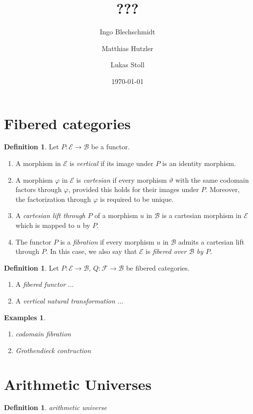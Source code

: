 \documentclass[a4paper]{amsart}
\author{Ingo Blechschmidt}
\author{Matthias Hutzler}
\author{Lukas Stoll}
\title{???}
\date{\today}
\theoremstyle{plain}
\theoremstyle{definition}
\newtheorem{definition}[theorem]{Definition}
\newtheorem{examples}[theorem]{Examples}
\begin{document}
\maketitle

\section{Fibered categories}

\begin{definition}
  Let $P:ℰ → ℬ$ be a functor.
  \begin{enumerate}
    \item A morphism in $ℰ$ is \emph{vertical} if its image under $P$ is an identity morphism.
    \item A morphism $φ$ in $ℰ$ is \emph{cartesian} if every morphism $ϑ$ with the same codomain factors through $φ$, provided this holds for their images under $P$.
      Moreover, the factorization through $φ$ is required to be unique.
    \item A \emph{cartesian lift through $P$} of a morphism $u$ in $ℬ$ is a cartesian morphism in $ℰ$ which is mapped to $u$ by $P$.
    \item The functor $P$ is a \emph{fibration} if every morphism $u$ in $ℬ$ admits a cartesian lift through $P$.
      In this case, we also say that $ℰ$ is \emph{fibered over $ℬ$ by $P$}.
  \end{enumerate}
\end{definition}

\begin{definition}
  Let $P:ℰ → ℬ$, $Q:ℱ → ℬ$ be fibered categories.
  \begin{enumerate}
    \item A \emph{fibered functor} ...
    \item A \emph{vertical natural transformation} ...
  \end{enumerate}
\end{definition}

\begin{examples}
  \hfill
  \begin{enumerate}
    \item \emph{codomain fibration}
    \item \emph{Grothendieck contruction}
  \end{enumerate}
\end{examples}

\section{Arithmetic Universes}

\begin{definition}
  \emph{arithmetic universe}
\end{definition}

\nocite{*}
\printbibliography
\end{document}
